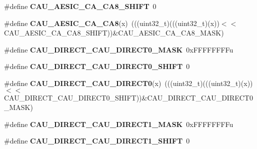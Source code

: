 \begin{DoxyCompactItemize}
\item 
\#define {\bfseries C\+A\+U\+\_\+\+A\+E\+S\+I\+C\+\_\+\+C\+A\+\_\+\+C\+A8\+\_\+\+S\+H\+I\+FT}~0\hypertarget{group__CAU__Register__Masks_gaa21e930792a5dae7f0b460040f2fb171}{}\label{group__CAU__Register__Masks_gaa21e930792a5dae7f0b460040f2fb171}

\item 
\#define {\bfseries C\+A\+U\+\_\+\+A\+E\+S\+I\+C\+\_\+\+C\+A\+\_\+\+C\+A8}(x)~(((uint32\+\_\+t)(((uint32\+\_\+t)(x))$<$$<$C\+A\+U\+\_\+\+A\+E\+S\+I\+C\+\_\+\+C\+A\+\_\+\+C\+A8\+\_\+\+S\+H\+I\+FT))\&C\+A\+U\+\_\+\+A\+E\+S\+I\+C\+\_\+\+C\+A\+\_\+\+C\+A8\+\_\+\+M\+A\+SK)\hypertarget{group__CAU__Register__Masks_ga54505996e12003026474a4c0c94696e6}{}\label{group__CAU__Register__Masks_ga54505996e12003026474a4c0c94696e6}

\item 
\#define {\bfseries C\+A\+U\+\_\+\+D\+I\+R\+E\+C\+T\+\_\+\+C\+A\+U\+\_\+\+D\+I\+R\+E\+C\+T0\+\_\+\+M\+A\+SK}~0x\+F\+F\+F\+F\+F\+F\+F\+Fu\hypertarget{group__CAU__Register__Masks_ga44f4bea009f3e9943e310dbbed98f7a3}{}\label{group__CAU__Register__Masks_ga44f4bea009f3e9943e310dbbed98f7a3}

\item 
\#define {\bfseries C\+A\+U\+\_\+\+D\+I\+R\+E\+C\+T\+\_\+\+C\+A\+U\+\_\+\+D\+I\+R\+E\+C\+T0\+\_\+\+S\+H\+I\+FT}~0\hypertarget{group__CAU__Register__Masks_ga53178110db052d34395df9ad7e9afd0e}{}\label{group__CAU__Register__Masks_ga53178110db052d34395df9ad7e9afd0e}

\item 
\#define {\bfseries C\+A\+U\+\_\+\+D\+I\+R\+E\+C\+T\+\_\+\+C\+A\+U\+\_\+\+D\+I\+R\+E\+C\+T0}(x)~(((uint32\+\_\+t)(((uint32\+\_\+t)(x))$<$$<$C\+A\+U\+\_\+\+D\+I\+R\+E\+C\+T\+\_\+\+C\+A\+U\+\_\+\+D\+I\+R\+E\+C\+T0\+\_\+\+S\+H\+I\+FT))\&C\+A\+U\+\_\+\+D\+I\+R\+E\+C\+T\+\_\+\+C\+A\+U\+\_\+\+D\+I\+R\+E\+C\+T0\+\_\+\+M\+A\+SK)\hypertarget{group__CAU__Register__Masks_ga2cb8f0d18407e272c7d87b9e747f278b}{}\label{group__CAU__Register__Masks_ga2cb8f0d18407e272c7d87b9e747f278b}

\item 
\#define {\bfseries C\+A\+U\+\_\+\+D\+I\+R\+E\+C\+T\+\_\+\+C\+A\+U\+\_\+\+D\+I\+R\+E\+C\+T1\+\_\+\+M\+A\+SK}~0x\+F\+F\+F\+F\+F\+F\+F\+Fu\hypertarget{group__CAU__Register__Masks_ga201696a74ac7fd3db77cd19d3d2110cf}{}\label{group__CAU__Register__Masks_ga201696a74ac7fd3db77cd19d3d2110cf}

\item 
\#define {\bfseries C\+A\+U\+\_\+\+D\+I\+R\+E\+C\+T\+\_\+\+C\+A\+U\+\_\+\+D\+I\+R\+E\+C\+T1\+\_\+\+S\+H\+I\+FT}~0\hypertarget{group__CAU__Register__Masks_ga99cc153a4a7217feeea9ccc898a38d98}{}\label{group__CAU__Register__Masks_ga99cc153a4a7217feeea9ccc898a38d98}


\end{DoxyCompactItemize}
